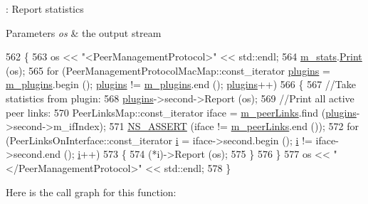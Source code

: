 \+: Report statistics 


\begin{DoxyParams}{Parameters}
{\em os} & the output stream \\
\hline
\end{DoxyParams}

\begin{DoxyCode}
562 \{
563   os << \textcolor{stringliteral}{"<PeerManagementProtocol>"} << std::endl;
564   \hyperlink{classns3_1_1dot11s_1_1PeerManagementProtocol_a3f618c99718829447348b1ad19b208d7}{m\_stats}.\hyperlink{structns3_1_1dot11s_1_1PeerManagementProtocol_1_1Statistics_a0b396d9d23c18d6340f1cf38bab4264a}{Print} (os);
565   \textcolor{keywordflow}{for} (PeerManagementProtocolMacMap::const\_iterator \hyperlink{namespacevisualizer_1_1base_a2d0082175fce0f1d28000f676c2646e5}{plugins} = \hyperlink{classns3_1_1dot11s_1_1PeerManagementProtocol_a9000d20f6feb3db279a020b237f49d64}{m\_plugins}.begin (); 
      \hyperlink{namespacevisualizer_1_1base_a2d0082175fce0f1d28000f676c2646e5}{plugins} != \hyperlink{classns3_1_1dot11s_1_1PeerManagementProtocol_a9000d20f6feb3db279a020b237f49d64}{m\_plugins}.end (); \hyperlink{namespacevisualizer_1_1base_a2d0082175fce0f1d28000f676c2646e5}{plugins}++)
566     \{
567       \textcolor{comment}{//Take statistics from plugin:}
568       \hyperlink{namespacevisualizer_1_1base_a2d0082175fce0f1d28000f676c2646e5}{plugins}->second->Report (os);
569       \textcolor{comment}{//Print all active peer links:}
570       PeerLinksMap::const\_iterator iface = \hyperlink{classns3_1_1dot11s_1_1PeerManagementProtocol_aa4522af32720f04cfbb693adb2024c55}{m\_peerLinks}.find (\hyperlink{namespacevisualizer_1_1base_a2d0082175fce0f1d28000f676c2646e5}{plugins}->second->m\_ifIndex);
571       \hyperlink{assert_8h_a6dccdb0de9b252f60088ce281c49d052}{NS\_ASSERT} (iface != \hyperlink{classns3_1_1dot11s_1_1PeerManagementProtocol_aa4522af32720f04cfbb693adb2024c55}{m\_peerLinks}.end ());
572       \textcolor{keywordflow}{for} (PeerLinksOnInterface::const\_iterator \hyperlink{bernuolliDistribution_8m_a6f6ccfcf58b31cb6412107d9d5281426}{i} = iface->second.begin (); \hyperlink{bernuolliDistribution_8m_a6f6ccfcf58b31cb6412107d9d5281426}{i} != iface->second.end (); 
      \hyperlink{bernuolliDistribution_8m_a6f6ccfcf58b31cb6412107d9d5281426}{i}++)
573         \{
574           (*i)->Report (os);
575         \}
576     \}
577   os << \textcolor{stringliteral}{"</PeerManagementProtocol>"} << std::endl;
578 \}
\end{DoxyCode}


Here is the call graph for this function\+:



